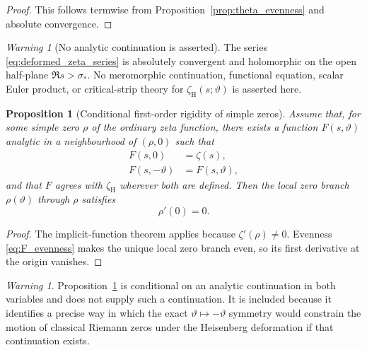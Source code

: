\documentclass[11pt]{amsart}
\numberwithin{equation}{section}
\theoremstyle{plain}
\newtheorem{proposition}[theorem]{Proposition}
\theoremstyle{definition}
\theoremstyle{remark}
\newtheorem{warning}[theorem]{Warning}
\begin{document}
\begin{proof}
This follows termwise from Proposition~\ref{prop:theta_evenness} and absolute
convergence.
\end{proof}

\begin{warning}[No analytic continuation is asserted]
\label{warn:no_continuation}
The series \eqref{eq:deformed_zeta_series} is absolutely convergent and holomorphic on the open half-plane $\Re s>\sigma_*$.  No meromorphic continuation, functional equation, scalar Euler product, or critical-strip theory
for $\zeta_{\mathrm H}(s;\vartheta)$ is asserted here.
\end{warning}

\begin{proposition}[Conditional first-order rigidity of simple zeros]
\label{prop:conditional_zero_rigidity}
Assume that, for some simple zero $\rho$ of the ordinary zeta function,
there exists a function $F(s,\vartheta)$ analytic in a neighbourhood of
$(\rho,0)$ such that
\begin{align}
F(s,0)
&=\zeta(s),
\label{eq:F_classical_boundary}\\
F(s,-\vartheta)
&=F(s,\vartheta),
\label{eq:F_evenness}
\end{align}
and that $F$ agrees with $\zeta_{\mathrm H}$ wherever both are defined.
Then the local zero branch $\rho(\vartheta)$ through $\rho$ satisfies
\begin{equation}
\rho'(0)=0.
\label{eq:zero_first_derivative_zero}
\end{equation}
\end{proposition}

\begin{proof}
The implicit-function theorem applies because $\zeta'(\rho)\neq0$.
Evenness \eqref{eq:F_evenness} makes the unique local zero branch even, so
its first derivative at the origin vanishes.
\end{proof}

\begin{warning}
\label{warn:conditional_zero_result}
Proposition~\ref{prop:conditional_zero_rigidity} is conditional on an analytic
continuation in both variables and does not supply such a continuation.  It
is included because it identifies a precise way in which the exact
$\vartheta\mapsto-\vartheta$ symmetry would constrain the motion of classical
Riemann zeros under the Heisenberg deformation if that continuation exists.
\end{warning}
\end{document}
